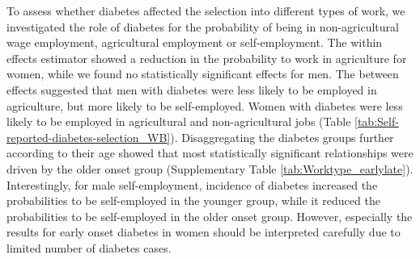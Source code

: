 \documentclass[12pt,english]{article}
\begin{document}
To assess whether diabetes affected the selection into different types of work, we investigated the role of diabetes for the probability of being in non-agricultural wage employment, agricultural employment or self-employment. The within effects estimator showed a reduction in the probability to work in agriculture for women, while we found no statistically significant effects for men. The between effects suggested that men with diabetes were less likely to be employed in agriculture, but more likely to be self-employed. Women with diabetes were less likely to be employed in agricultural and non-agricultural jobs  (Table \ref{tab:Self-reported-diabetes-selection_WB}). Disaggregating the diabetes groups further according to their age showed that most statistically significant relationships were driven by the older onset group (Supplementary Table \ref{tab:Worktype_earlylate}). Interestingly, for male self-employment, incidence of diabetes increased the probabilities to be self-employed in the younger group, while it reduced the probabilities to be self-employed in the older onset group. However, especially the results for early onset diabetes in women should be interpreted carefully due to limited number of diabetes cases.
\end{document}

